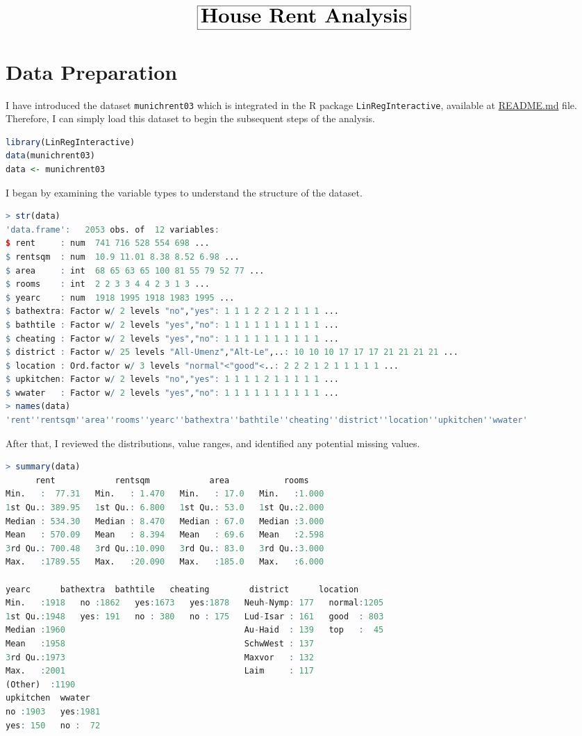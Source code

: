 \documentclass[15pt,a4paper]{report}
\begin{document}
\[
	\boxed{\huge \textbf{House Rent Analysis}}
\]
\section*{Data Preparation}
I have introduced the dataset \lstinline[language=R]|munichrent03| which is integrated in the R package \lstinline[language=R]|LinRegInteractive|, available at \href{https://github.com/taitran0102/rent-analysis/blob/main/README.md}{README.md} file. Therefore, I can simply load this dataset to begin the subsequent steps of the analysis.
\begin{lstlisting}[language=R]
library(LinRegInteractive)
data(munichrent03)
data <- munichrent03 
\end{lstlisting}
I began by examining the variable types to understand the structure of the dataset. 
\begin{lstlisting}[language=R]
> str(data)
'data.frame':	2053 obs. of  12 variables:
$ rent     : num  741 716 528 554 698 ...
$ rentsqm  : num  10.9 11.01 8.38 8.52 6.98 ...
$ area     : int  68 65 63 65 100 81 55 79 52 77 ...
$ rooms    : int  2 2 3 3 4 4 2 3 1 3 ...
$ yearc    : num  1918 1995 1918 1983 1995 ...
$ bathextra: Factor w/ 2 levels "no","yes": 1 1 1 2 2 1 2 1 1 1 ...
$ bathtile : Factor w/ 2 levels "yes","no": 1 1 1 1 1 1 1 1 1 1 ...
$ cheating : Factor w/ 2 levels "yes","no": 1 1 1 1 1 1 1 1 1 1 ...
$ district : Factor w/ 25 levels "All-Umenz","Alt-Le",..: 10 10 10 17 17 17 21 21 21 21 ...
$ location : Ord.factor w/ 3 levels "normal"<"good"<..: 2 2 2 1 2 1 1 1 1 1 ...
$ upkitchen: Factor w/ 2 levels "no","yes": 1 1 1 1 2 1 1 1 1 1 ...
$ wwater   : Factor w/ 2 levels "yes","no": 1 1 1 1 1 1 1 1 1 1 ...
> names(data)
'rent''rentsqm''area''rooms''yearc''bathextra''bathtile''cheating''district''location''upkitchen''wwater'
\end{lstlisting}
After that, I reviewed the distributions, value ranges, and identified any potential missing values.
\begin{lstlisting}[language=R]
> summary(data)
      rent            rentsqm            area           rooms      
Min.   :  77.31   Min.   : 1.470   Min.   : 17.0   Min.   :1.000  
1st Qu.: 389.95   1st Qu.: 6.800   1st Qu.: 53.0   1st Qu.:2.000  
Median : 534.30   Median : 8.470   Median : 67.0   Median :3.000  
Mean   : 570.09   Mean   : 8.394   Mean   : 69.6   Mean   :2.598  
3rd Qu.: 700.48   3rd Qu.:10.090   3rd Qu.: 83.0   3rd Qu.:3.000  
Max.   :1789.55   Max.   :20.090   Max.   :185.0   Max.   :6.000  

yearc      bathextra  bathtile   cheating        district      location   
Min.   :1918   no :1862   yes:1673   yes:1878   Neuh-Nymp: 177   normal:1205  
1st Qu.:1948   yes: 191   no : 380   no : 175   Lud-Isar : 161   good  : 803  
Median :1960                                    Au-Haid  : 139   top   :  45  
Mean   :1958                                    SchwWest : 137                
3rd Qu.:1973                                    Maxvor   : 132                
Max.   :2001                                    Laim     : 117                
(Other)  :1190                
upkitchen  wwater    
no :1903   yes:1981  
yes: 150   no :  72  

\end{lstlisting}
\end{document}
